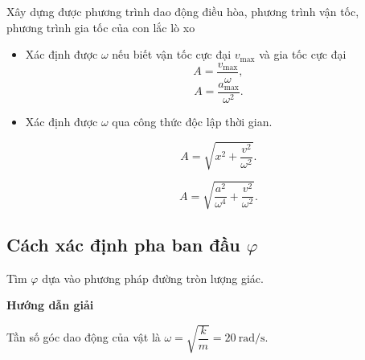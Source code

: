 \begin{dang}{Xây dựng được phương trình dao động điều hòa, phương trình vận tốc,\\ phương trình gia tốc của con lắc lò xo}
{\begin{itemize}
			\begin{equation*} A=\dfrac{l_\text{max}-l_\text{min}}{2}. \end{equation*}
			\item Xác định được $\omega$ nếu biết vận tốc cực đại $v_\text{max}$ và gia tốc cực đại
			\begin{equation*}
				A=\dfrac{v_\text{max}}{\omega},
			\end{equation*}
			\begin{equation*}
				A=\dfrac{a_\text{max}}{\omega^2}.
			\end{equation*}
			
			\item Xác định được $\omega$ qua công thức độc lập thời gian.
			
			\begin{equation*}
				A=\sqrt{x^2+\dfrac{v^2}{\omega^2}}.
			\end{equation*}
			
			\begin{equation*}
				A=\sqrt{\dfrac{a^2}{\omega^4}+\dfrac{v^2}{\omega^2}}.
			\end{equation*}
			
		\end{itemize}
		\subsection{Cách xác định pha ban đầu $\varphi$}
		
		Tìm $\varphi$ dựa vào phương pháp đường tròn lượng giác.
	}
	
	{\begin{center}
			\textbf{Hướng dẫn giải}
		\end{center}
		Tần số góc dao động của vật là $ \omega = \sqrt {\dfrac {k}{m}}=20\ \text{rad/s}$.
		
}
\end{dang}
